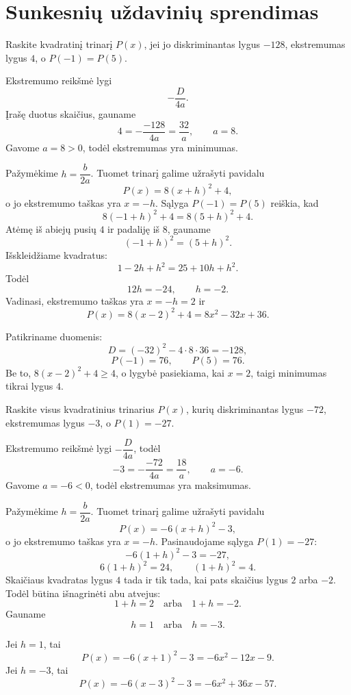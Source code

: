 \documentclass[11pt,a4paper]{scrartcl}
\numberwithin{exercise}{section}
\begin{document}
\section{Sunkesnių uždavinių sprendimas}

\begin{example}\label{pv:sunk_diskriminantas_vienodos}
Raskite kvadratinį trinarį $P(x)$, jei jo diskriminantas lygus
$-128$, ekstremumas lygus $4$, o $P(-1)=P(5)$.
\end{example}

\begin{solution}
Ekstremumo reikšmė lygi
\[
-\frac{D}{4a}.
\]
Įrašę duotus skaičius, gauname
\[
4=-\frac{-128}{4a}=\frac{32}{a},
\qquad a=8.
\]
Gavome $a=8>0$, todėl ekstremumas yra minimumas.

Pažymėkime $h=\dfrac{b}{2a}$. Tuomet trinarį galime užrašyti pavidalu
\[
P(x)=8(x+h)^2+4,
\]
o jo ekstremumo taškas yra $x=-h$.
Sąlyga $P(-1)=P(5)$ reiškia, kad
\[
8(-1+h)^2+4=8(5+h)^2+4.
\]
Atėmę iš abiejų pusių $4$ ir padaliję iš $8$, gauname
\[
(-1+h)^2=(5+h)^2.
\]
Išskleidžiame kvadratus:
\[
1-2h+h^2=25+10h+h^2.
\]
Todėl
\[
12h=-24,\qquad h=-2.
\]
Vadinasi, ekstremumo taškas yra $x=-h=2$ ir
\[
P(x)=8(x-2)^2+4=8x^2-32x+36.
\]

Patikriname duomenis:
\[
D=(-32)^2-4\cdot8\cdot36=-128,
\]
\[
P(-1)=76,\qquad P(5)=76.
\]
Be to, $8(x-2)^2+4\ge4$, o lygybė pasiekiama, kai $x=2$,
taigi minimumas tikrai lygus $4$.

\end{solution}

\begin{example}\label{pv:sunk_du_variantai}
Raskite visus kvadratinius trinarius $P(x)$, kurių diskriminantas
lygus $-72$, ekstremumas lygus $-3$, o $P(1)=-27$.
\end{example}

\begin{solution}
Ekstremumo reikšmė lygi $-\dfrac{D}{4a}$, todėl
\[
-3=-\frac{-72}{4a}=\frac{18}{a},
\qquad a=-6.
\]
Gavome $a=-6<0$, todėl ekstremumas yra maksimumas.

Pažymėkime $h=\dfrac{b}{2a}$. Tuomet trinarį galime užrašyti pavidalu
\[
P(x)=-6(x+h)^2-3,
\]
o jo ekstremumo taškas yra $x=-h$.
Pasinaudojame sąlyga $P(1)=-27$:
\[
-6(1+h)^2-3=-27,
\]
\[
6(1+h)^2=24,
\qquad (1+h)^2=4.
\]
Skaičiaus kvadratas lygus $4$ tada ir tik tada, kai pats skaičius
lygus $2$ arba $-2$. Todėl būtina išnagrinėti abu atvejus:
\[
1+h=2 \quad\text{arba}\quad 1+h=-2.
\]
Gauname
\[
h=1 \quad\text{arba}\quad h=-3.
\]

Jei $h=1$, tai
\[
P(x)=-6(x+1)^2-3=-6x^2-12x-9.
\]
Jei $h=-3$, tai
\[
P(x)=-6(x-3)^2-3=-6x^2+36x-57.
\]



\end{solution}
\end{document}
